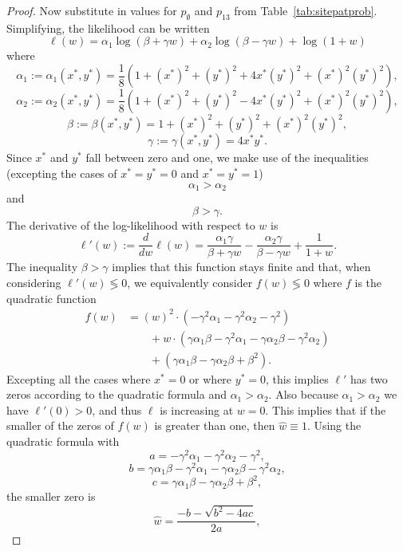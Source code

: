 \begin{proof}
Now substitute in values for $p_{\emptyset}$ and $p_{13}$ from Table~\ref{tab:sitepatprob}.
Simplifying, the likelihood can be written
$$
\ell(w) = \alpha_1\log(\beta+\gamma w) + \alpha_2\log(\beta-\gamma w) + \log(1+w)
$$
where
$$
\alpha_1 := \alpha_1(x^*, y^*) = \frac{1}{8} \left(1+(x^*)^2+(y^*)^2+4x^*(y^*)^2+(x^*)^2(y^*)^2\right),
$$
$$
\alpha_2 := \alpha_2(x^*, y^*) = \frac{1}{8}\left(1+(x^*)^2+(y^*)^2-4x^*(y^*)^2+(x^*)^2(y^*)^2\right),
$$
$$
\beta := \beta(x^*, y^*) = 1+(x^*)^2+(y^*)^2+(x^*)^2(y^*)^2,
$$
$$
\gamma := \gamma(x^*, y^*) = 4x^*y^*.
$$
Since $x^*$ and $y^*$ fall between zero and one, we make use of the inequalities (excepting the cases of $x^*=y^*=0$ and $x^*=y^*=1$)
$$
\alpha_1 > \alpha_2
$$
and
$$
\beta > \gamma.
$$
The derivative of the log-likelihood with respect to $w$ is
$$
\ell'(w) := \frac{d}{dw} \ell(w) = \frac{\alpha_1 \gamma}{\beta+\gamma w} - \frac{\alpha_2 \gamma}{\beta-\gamma w} + \frac{1}{1+w}.
$$
The inequality $\beta > \gamma$ implies that this function stays finite and that, when considering $\ell'(w) \lessgtr 0$, we equivalently consider $f(w) \lessgtr 0$ where $f$ is the quadratic function
\begin{align*}
f(w) &= (w)^2\cdot(-\gamma^2\alpha_1-\gamma^2\alpha_2-\gamma^2) \\
      &\qquad + w\cdot(\gamma\alpha_1\beta-\gamma^2\alpha_1-\gamma\alpha_2\beta-\gamma^2\alpha_2) \\
      &\qquad + (\gamma\alpha_1\beta-\gamma\alpha_2\beta+\beta^2).
\end{align*}
Excepting all the cases where $x^*=0$ or where $y^*=0$, this implies $\ell'$ has two zeros according to the quadratic formula and $\alpha_1 > \alpha_2$.
Also because $\alpha_1 > \alpha_2$ we have $\ell'(0) > 0$, and thus $\ell$ is increasing at $w=0$.
This implies that if the smaller of the zeros of $f(w)$ is greater than one, then $\hat{w} \equiv 1$.
Using the quadratic formula with
$$
a = -\gamma^2 \alpha_1 - \gamma^2 \alpha_2 - \gamma^2,
$$
$$
b = \gamma \alpha_1 \beta - \gamma^2\alpha_1 - \gamma \alpha_2 \beta - \gamma^2 \alpha_2,
$$
$$
c = \gamma \alpha_1 \beta - \gamma \alpha_2 \beta + \beta^2,
$$
the smaller zero is
$$
\hat{w} = \frac{-b - \sqrt{b^2 - 4ac}}{2a},
$$
\end{proof}

